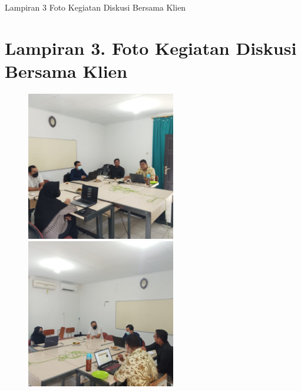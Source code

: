 \begin{appendices}{Lampiran 3 Foto Kegiatan Diskusi Bersama Klien}
    \section*{Lampiran 3. Foto Kegiatan Diskusi Bersama Klien}
    \begin{figure}[H]
            \includegraphics[width=6.5cm,height=6.5cm]{gambar/dokumentasi/diskusi1}
            \hspace*{0.3cm}
            \includegraphics[width=6.5cm,height=6.5cm]{gambar/dokumentasi/diskusi2}
    \end{figure}
\end{appendices}

